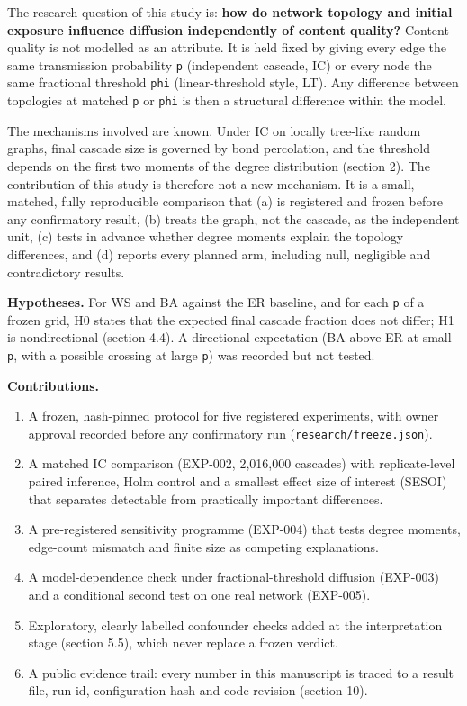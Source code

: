 \documentclass[
]{article}
\providecommand{\tightlist}{%
  \setlength{\itemsep}{0pt}\setlength{\parskip}{0pt}}
\begin{document}
The research question of this study is: \textbf{how do network topology
and initial exposure influence diffusion independently of content
quality?} Content quality is not modelled as an attribute. It is held
fixed by giving every edge the same transmission probability \texttt{p}
(independent cascade, IC) or every node the same fractional threshold
\texttt{phi} (linear-threshold style, LT). Any difference between
topologies at matched \texttt{p} or \texttt{phi} is then a structural
difference within the model.

The mechanisms involved are known. Under IC on locally tree-like random
graphs, final cascade size is governed by bond percolation, and the
threshold depends on the first two moments of the degree distribution
(section 2). The contribution of this study is therefore not a new
mechanism. It is a small, matched, fully reproducible comparison that
(a) is registered and frozen before any confirmatory result, (b) treats
the graph, not the cascade, as the independent unit, (c) tests in
advance whether degree moments explain the topology differences, and (d)
reports every planned arm, including null, negligible and contradictory
results.

\textbf{Hypotheses.} For WS and BA against the ER baseline, and for each
\texttt{p} of a frozen grid, H0 states that the expected final cascade
fraction does not differ; H1 is nondirectional (section 4.4). A
directional expectation (BA above ER at small \texttt{p}, with a
possible crossing at large \texttt{p}) was recorded but not tested.

\textbf{Contributions.}

\begin{enumerate}
\def\labelenumi{\arabic{enumi}.}
\tightlist
\item
  A frozen, hash-pinned protocol for five registered experiments, with
  owner approval recorded before any confirmatory run
  (\texttt{research/freeze.json}).
\item
  A matched IC comparison (EXP-002, 2,016,000 cascades) with
  replicate-level paired inference, Holm control and a smallest effect
  size of interest (SESOI) that separates detectable from practically
  important differences.
\item
  A pre-registered sensitivity programme (EXP-004) that tests degree
  moments, edge-count mismatch and finite size as competing
  explanations.
\item
  A model-dependence check under fractional-threshold diffusion
  (EXP-003) and a conditional second test on one real network (EXP-005).
\item
  Exploratory, clearly labelled confounder checks added at the
  interpretation stage (section 5.5), which never replace a frozen
  verdict.
\item
  A public evidence trail: every number in this manuscript is traced to
  a result file, run id, configuration hash and code revision (section
  10).
\end{enumerate}
\end{document}

